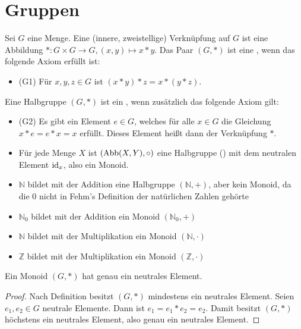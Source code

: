\section{Gruppen}

\begin{definition}
	Sei $G$ eine Menge. Eine (innere, zweistellige) Verknüpfung
	auf $G$ ist eine Abbildung $*: G \times G \to G, (x,y) \mapsto x*y$. Das Paar $(G,*)$ ist eine
	, wenn das folgende Axiom erfüllt ist:
	\begin{itemize}
		\item (G1) Für $x,y,z \in G$ ist $(x*y)*z=x*(y*z)$.
	\end{itemize}
		Eine Halbgruppe $(G,*)$ ist ein , wenn zusätzlich das folgende Axiom gilt:
	\begin{itemize}
		\item (G2) Es gibt ein Element $e \in G$, welches für alle $x \in G$ die Gleichung $x*e=e*x=x$
		erfüllt. Dieses Element heißt dann  der Verknüpfung $*$.  
	\end{itemize}
\end{definition}

\begin{example}
	\begin{itemize}
		\item Für jede Menge $X$ ist $(\operatorname{Abb}(X,Y), \circ)$ eine Halbgruppe () mit dem neutralen Element
		$\operatorname{id}_x$, also ein Monoid.
		\item $\mathbb N$ bildet mit der Addition eine Halbgruppe $(\mathbb N,+)$, aber kein Monoid,
		da die 0 nicht in Fehm's Definition der natürlichen Zahlen gehörte
		\item $\mathbb N_0$ bildet mit der Addition ein Monoid $(\mathbb N_0,+)$
		\item $\mathbb N$ bildet mit der Multiplikation ein Monoid $(\mathbb N, \cdot)$
		\item $\mathbb Z$ bildet mit der Multiplikation ein Monoid $(\mathbb Z, \cdot)$
	\end{itemize}
\end{example}

\begin{proposition}
	Ein Monoid $(G,*)$ hat genau ein neutrales Element. 
\end{proposition}
\begin{proof}
	Nach Definition besitzt $(G,*)$ mindestens ein neutrales Element. Seien $e_1,e_2\in G$ neutrale Elemente. Dann 
	ist $e_1=e_1 * e_2=e_2$. Damit besitzt $(G,*)$ höchstens ein neutrales Element, also genau ein neutrales Element.
\end{proof}


